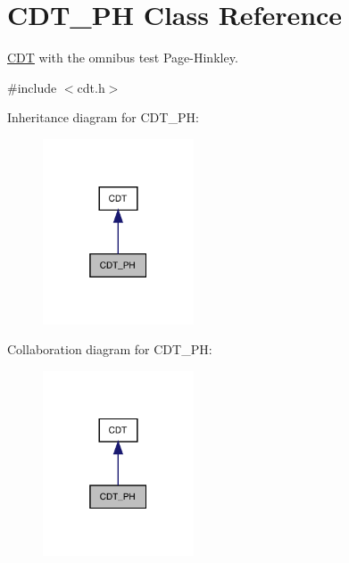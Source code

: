 \hypertarget{class_c_d_t___p_h}{}\section{C\+D\+T\+\_\+\+PH Class Reference}
\label{class_c_d_t___p_h}


\mbox{\hyperlink{class_c_d_t}{C\+DT}} with the omnibus test Page-\/\+Hinkley.  




{\ttfamily \#include $<$cdt.\+h$>$}



Inheritance diagram for C\+D\+T\+\_\+\+PH\+:
\nopagebreak
\begin{figure}[H]
\begin{center}
\leavevmode
\includegraphics[width=127pt]{class_c_d_t___p_h__inherit__graph}
\end{center}
\end{figure}


Collaboration diagram for C\+D\+T\+\_\+\+PH\+:
\nopagebreak
\begin{figure}[H]
\begin{center}
\leavevmode
\includegraphics[width=127pt]{class_c_d_t___p_h__coll__graph}
\end{center}
\end{figure}
